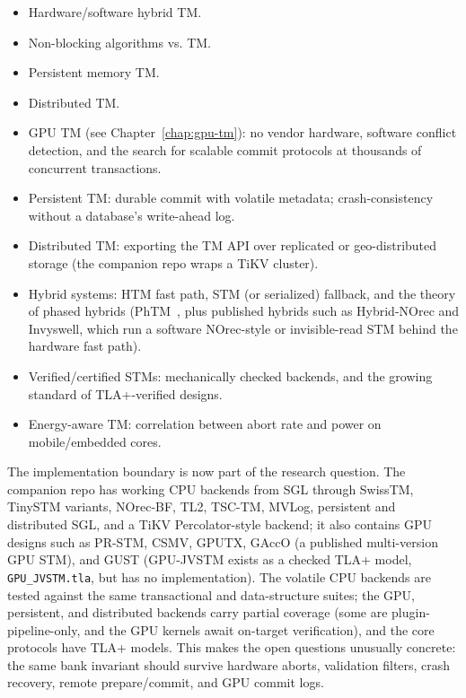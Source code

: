 \begin{itemize}
    \item Hardware/software hybrid TM.
    \item Non-blocking algorithms vs. TM.
    \item Persistent memory TM.
    \item Distributed TM.
    \item GPU TM (see Chapter~\ref{chap:gpu-tm}): no vendor hardware,
          software conflict detection, and the search for scalable commit
          protocols at thousands of concurrent transactions.
    \item Persistent TM: durable commit with volatile metadata; crash-consistency without a database's write-ahead log.
    \item Distributed TM: exporting the TM API over replicated or geo-distributed storage (the companion repo wraps a TiKV cluster).
    \item Hybrid systems: HTM fast path, STM (or serialized) fallback, and the theory of phased hybrids (PhTM~\cite{lev07phased}, plus published hybrids such as Hybrid-NOrec and Invyswell, which run a software NOrec-style or invisible-read STM behind the hardware fast path).
    \item Verified/certified STMs: mechanically checked backends, and the growing standard of TLA+-verified designs.
    \item Energy-aware TM: correlation between abort rate and power on mobile/embedded cores.
\end{itemize}

The implementation boundary is now part of the research question. The companion
repo has working CPU backends from SGL through SwissTM, TinySTM variants,
NOrec-BF, TL2, TSC-TM, MVLog, persistent and distributed SGL, and a TiKV
Percolator-style backend; it also contains GPU designs such as PR-STM, CSMV,
GPUTX, GAccO (a published multi-version GPU STM), and GUST (GPU-JVSTM exists as a checked TLA+ model,
\texttt{GPU\_JVSTM.tla}, but has no implementation). The volatile CPU backends
are tested against the same transactional and data-structure suites; the GPU,
persistent, and distributed backends carry partial coverage (some are
plugin-pipeline-only, and the GPU kernels await on-target verification), and
the core protocols have TLA+ models. This makes
the open questions unusually concrete: the same bank invariant should survive
hardware aborts, validation filters, crash recovery, remote prepare/commit, and
GPU commit logs.

